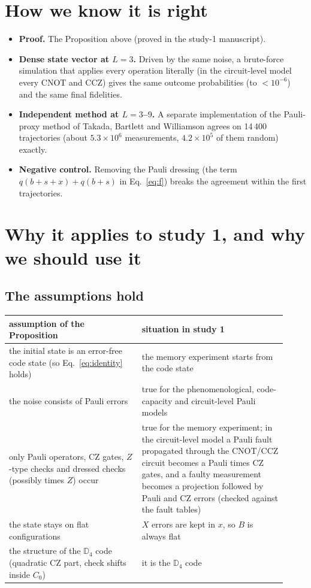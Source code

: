 \documentclass[11pt,a4paper]{article}
\begin{document}
\section{How we know it is right}
\begin{itemize}
\item \textbf{Proof.} The Proposition above (proved in the study-1 manuscript).
\item \textbf{Dense state vector at $L=3$.} Driven by the same noise, a brute-force simulation that applies every operation literally (in the circuit-level model every CNOT and CCZ) gives the same outcome probabilities (to $<10^{-6}$) and the same final fidelities.
\item \textbf{Independent method at $L=3$--$9$.} A separate implementation of the Pauli-proxy method of Takada, Bartlett and Williamson agrees on 14\,400 trajectories (about $5.3\times10^6$ measurements, $4.2\times10^5$ of them random) exactly.
\item \textbf{Negative control.} Removing the Pauli dressing (the term $q(b+s+x)+q(b+s)$ in Eq.~\eqref{eq:f}) breaks the agreement within the first trajectories.
\end{itemize}

\section{Why it applies to study 1, and why we should use it}

\subsection{The assumptions hold}
\begin{center}
\begin{tabular}{>{\raggedright}p{0.44\linewidth}p{0.48\linewidth}}
\toprule
assumption of the Proposition & situation in study 1 \\
\midrule
the initial state is an error-free code state (so Eq.~\eqref{eq:identity} holds) & the memory experiment starts from the code state \\
the noise consists of Pauli errors & true for the phenomenological, code-capacity and circuit-level Pauli models \\
only Pauli operators, CZ gates, $Z$-type checks and dressed checks (possibly times $Z$) occur & true for the memory experiment; in the circuit-level model a Pauli fault propagated through the CNOT/CCZ circuit becomes a Pauli times CZ gates, and a faulty measurement becomes a projection followed by Pauli and CZ errors (checked against the fault tables) \\
the state stays on flat configurations & $X$ errors are kept in $x$, so $B$ is always flat \\
the structure of the $\mathbb{D}_4$ code (quadratic CZ part, check shifts inside $C_0$) & it is the $\mathbb{D}_4$ code \\
\bottomrule
\end{tabular}
\end{center}
\end{document}
